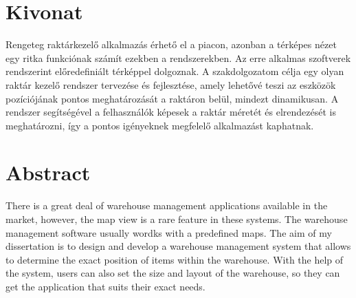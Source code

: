 \setcounter{page}{1}

\selecthungarian

\chapter*{Kivonat}

Rengeteg raktárkezelő alkalmazás érhető el a piacon, azonban a térképes nézet egy ritka funkciónak számít ezekben a rendszerekben. Az erre alkalmas szoftverek rendszerint előredefiniált térképpel dolgoznak.
A szakdolgozatom célja egy olyan raktár kezelő rendszer tervezése és fejlesztése, amely lehetővé teszi az eszközök pozíciójának pontos meghatározását a raktáron belül, mindezt dinamikusan. A rendszer segítségével a felhasználók képesek a raktár méretét és elrendezését is meghatározni, így a pontos igényeknek megfelelő alkalmazást kaphatnak.

\vfill
\selectenglish

\chapter*{Abstract}

There is a great deal of warehouse management applications available in the market, however, the map view is a rare feature in these systems. The warehouse management software usually wordks with a predefined maps.
The aim of my dissertation is to design and develop a warehouse management system that allows to determine the exact position of items within the warehouse. With the help of the system, users can also set the size and layout of the warehouse, so they can get the application that suits their exact needs.


\vfill
\selectthesislanguage

\setcounter{romanPage}{\value{page}}
